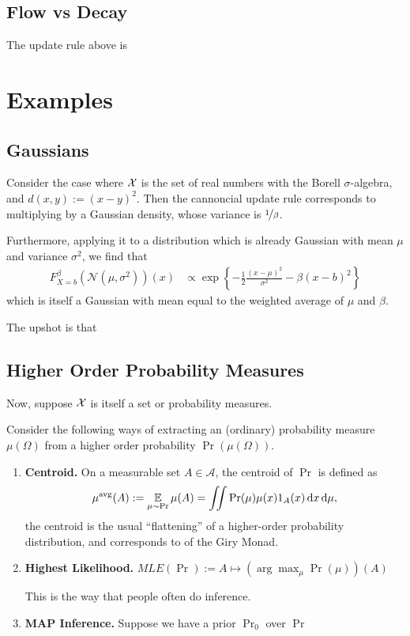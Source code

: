 \documentclass{article}
\begin{document}
\subsection*{Flow vs Decay}
The update rule above is 




\section{Examples}
\subsection{Gaussians}
Consider the case where $\mathcal X$ is the set of real numbers with the Borell $\sigma$-algebra, and $d(x,y) := (x-y)^2$.
Then the cannoncial update rule corresponds to multiplying by a Gaussian density, whose variance is $\nicefrac1\beta$.

Furthermore, applying it to a distribution which is already Gaussian with mean $\mu$ and variance $\sigma^2$, we find that
\begin{align*}
    F^{\beta}_{X=b}(\mathcal N(\mu, \sigma^2))(x) &\propto
     \exp\left\{ - \frac12 \frac{(x-\mu)^2}{ \sigma^2 } - \beta(x-b)^2\right\}
\end{align*}
which is itself a Gaussian with mean equal to the weighted average of $\mu$ and $\beta$. 

The upshot is that 


\subsection{Higher Order Probability Measures}
Now, suppose $\mathcal X$ is itself a set or probability measures. 

Consider the following ways of extracting an (ordinary) probability measure $\mu(\Omega)$
from a higher order probability $\Pr(\mu(\Omega))$.

\begin{enumerate}
    \item \textbf{Centroid.}
        On a measurable set $A \in \mathcal A$, the centroid of $\Pr$ is defined as
        \[
            \mu^{\text{avg}}(A) := \operatorname*{\mathbb{E}}_{\mu \sim \Pr} \mu(A) =
                \iint \Pr(\mu) \mu(x) 1_{A}(x)\, \mathrm d x\,\mathrm d\mu,
        \]
        the centroid is the usual ``flattening'' of a higher-order probability distribution, and corresponds to
        of the Giry Monad.

    \item \textbf{Highest Likelihood.}
        $\textit{MLE}(\Pr) := A \mapsto (\arg\max_\mu \Pr(\mu))(A)$

        This is the way that people often do inference.

    \item \textbf{MAP Inference.}
        Suppose we have a prior $\Pr_0$ over  $\Pr$

\end{enumerate}
\end{document}
